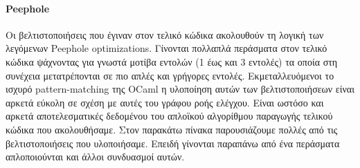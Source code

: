 \documentclass[12pt]{article}
\begin{document}
\paragraph{Peephole} Οι βελτιστοποιήσεις που έγιναν στον τελικό κώδικα ακολουθούν τη λογική των λεγόμενων Peephole optimizations. Γίνονται πολλαπλά περάσματα στον τελικό κώδικα ψάχνοντας για γνωστά μοτίβα εντολών (1 έως και 3 εντολές) τα οποία στη συνέχεια μετατρέπονται σε πιο απλές και γρήγορες εντολές. Εκμεταλλευόμενοι το ισχυρό pattern-matching της OCaml η υλοποίηση αυτών των βελτιστοποιήσεων είναι αρκετά εύκολη σε σχέση με αυτές του γράφου ροής ελέγχου. Είναι ωστόσο και αρκετά αποτελεσματικές δεδομένου του απλοϊκού αλγορίθμου παραγωγής τελικού κώδικα που ακολουθήσαμε. Στον παρακάτω πίνακα παρουσιάζουμε πολλές από τις βελτιστοποιήσεις που υλοποιήσαμε. Επειδή γίνονται παραπάνω από ένα περάσματα απλοποιούνται και άλλοι συνδυασμοί αυτών.

\end{document}
